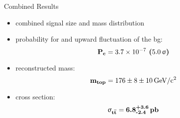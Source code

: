 \begin{frame}{Combined Results}
	
	\begin{itemize}\itemfill
		\item combined signal size and mass distribution
		\item probability for and upward fluctuation of the bg: 
		{\begin{equation*} \z{\textbf{P}}_{\z{\textbf{c}}} = \textbf{\SI{3.7e-7}{} (\SI{5.0}{\upsigma})} \end{equation*}}
		\item reconstructed mass:
		{\begin{equation*} \z{\textbf{m}}_{\z{\textbf{top}}} = \textbf{\SI[parse-numbers=false]{176\pm8\pm10}{\giga\electronvolt\per c^2}} \end{equation*}}
		\item cross section:
		{\begin{equation*} \mathbf{\upsigma}_{\z{\textbf{t}}\overline{\z{\textbf{t}}}} = \textbf{6.8}^{\textbf{+3.6}}_{\textbf{-2.4}}\, \z{\textbf{pb}} \end{equation*}}
	\end{itemize}
	
\end{frame}

